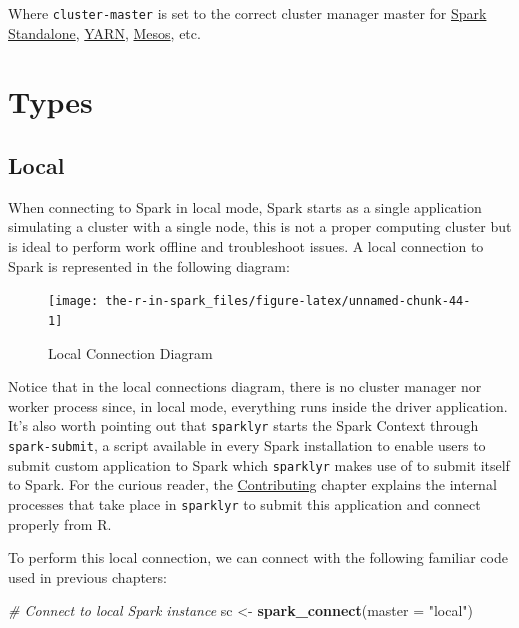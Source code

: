 \documentclass[]{book}
\newenvironment{Shaded}{\begin{snugshade}}{\end{snugshade}}
\newcommand{\CommentTok}[1]{\textcolor[rgb]{0.56,0.35,0.01}{\textit{#1}}}
\newcommand{\DataTypeTok}[1]{\textcolor[rgb]{0.13,0.29,0.53}{#1}}
\newcommand{\KeywordTok}[1]{\textcolor[rgb]{0.13,0.29,0.53}{\textbf{#1}}}
\newcommand{\NormalTok}[1]{#1}
\newcommand{\StringTok}[1]{\textcolor[rgb]{0.31,0.60,0.02}{#1}}
\theoremstyle{definition}
\theoremstyle{definition}
\theoremstyle{definition}
\theoremstyle{remark}
\begin{document}
Where \texttt{cluster-master} is set to the correct cluster manager
master for \href{Standalone}{Spark Standalone}, \href{Yarn}{YARN},
\protect\hyperlink{mesos-1}{Mesos}, etc.

\hypertarget{types}{%
\section{Types}\label{types}}

\hypertarget{local}{%
\subsection{Local}\label{local}}

When connecting to Spark in local mode, Spark starts as a single
application simulating a cluster with a single node, this is not a
proper computing cluster but is ideal to perform work offline and
troubleshoot issues. A local connection to Spark is represented in the
following diagram:

\begin{figure}

{\centering \texttt{[image: the-r-in-spark\_files/figure-latex/unnamed-chunk-44-1]} 

}

\caption{Local Connection Diagram}\label{fig:unnamed-chunk-44}
\end{figure}

Notice that in the local connections diagram, there is no cluster
manager nor worker process since, in local mode, everything runs inside
the driver application. It's also worth pointing out that
\texttt{sparklyr} starts the Spark Context through
\texttt{spark-submit}, a script available in every Spark installation to
enable users to submit custom application to Spark which
\texttt{sparklyr} makes use of to submit itself to Spark. For the
curious reader, the \protect\hyperlink{contributing}{Contributing}
chapter explains the internal processes that take place in
\texttt{sparklyr} to submit this application and connect properly from
R.

To perform this local connection, we can connect with the following
familiar code used in previous chapters:

\begin{Shaded}
\begin{Highlighting}[]
\CommentTok{# Connect to local Spark instance}
\NormalTok{sc <-}\StringTok{ }\KeywordTok{spark_connect}\NormalTok{(}\DataTypeTok{master =} \StringTok{"local"}\NormalTok{)}
\end{Highlighting}
\end{Shaded}
\end{document}
